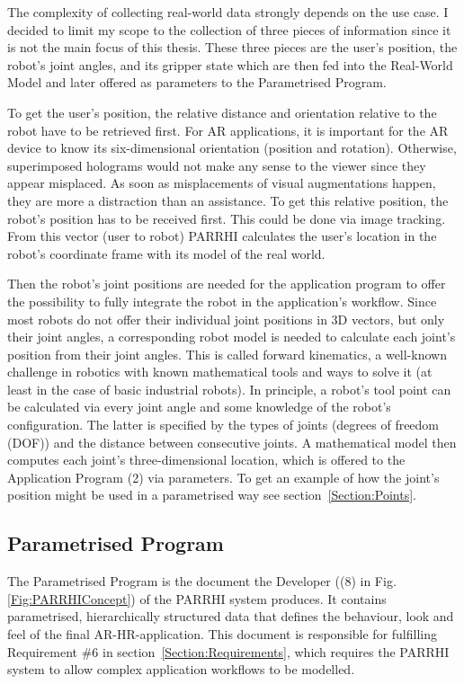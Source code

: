 The complexity of collecting real-world data strongly depends on the use case. I decided to limit my scope to the collection of three pieces of information since it is not the main focus of this thesis. These three pieces are the user’s position, the robot’s joint angles, and its gripper state which are then fed into the Real-World Model and later offered as parameters to the Parametrised Program.

To get the user’s position, the relative distance and orientation relative to the robot have to be retrieved first. For AR applications, it is important for the AR device to know its six-dimensional orientation (position and rotation). Otherwise, superimposed holograms would not make any sense to the viewer since they appear misplaced. As soon as misplacements of visual augmentations happen, they are more a distraction than an assistance. To get this relative position, the robot’s position has to be received first. This could be done via image tracking. From this vector (user to robot) PARRHI calculates the user’s location in the robot’s coordinate frame with its model of the real world.

Then the robot’s joint positions are needed for the application program to offer the possibility to fully integrate the robot in the application’s workflow. Since most robots do not offer their individual joint positions in 3D vectors, but only their joint angles, a corresponding robot model is needed to calculate each joint’s position from their joint angles. This is called forward kinematics, a well-known challenge in robotics with known mathematical tools and ways to solve it (at least in the case of basic industrial robots). In principle, a robot’s tool point can be calculated via every joint angle and some knowledge of the robot’s configuration. The latter is specified by the types of joints (degrees of freedom (DOF)) and the distance between consecutive joints. A mathematical model then computes each joint’s three-dimensional location, which is offered to the Application Program (2) via parameters. To get an example of how the joint’s position might be used in a parametrised way see section~\ref{Section:Points}.

\subsection{Parametrised Program}
\label{Section:ParametrisedProgram}
The Parametrised Program is the document the Developer ((8) in Fig. \ref{Fig:PARRHIConcept}) of the PARRHI system produces. It contains parametrised, hierarchically structured data that defines the behaviour, look and feel of the final AR-HR-application. This document is responsible for fulfilling Requirement \#6 in section~\ref{Section:Requirements}, which requires the PARRHI system to allow complex application workflows to be modelled.

